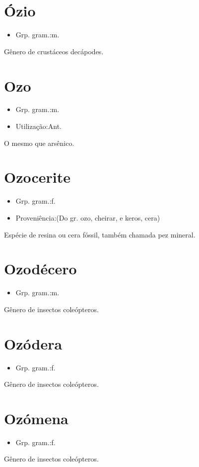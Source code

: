 \section{Ózio}
\begin{itemize}
\item {Grp. gram.:m.}
\end{itemize}
Gênero de crustáceos decápodes.
\section{Ozo}
\begin{itemize}
\item {Grp. gram.:m.}
\end{itemize}
\begin{itemize}
\item {Utilização:Ant.}
\end{itemize}
O mesmo que \textunderscore arsênico\textunderscore .
\section{Ozocerite}
\begin{itemize}
\item {Grp. gram.:f.}
\end{itemize}
\begin{itemize}
\item {Proveniência:(Do gr. \textunderscore ozo\textunderscore , cheirar, e \textunderscore keros\textunderscore , cera)}
\end{itemize}
Espécie de resina ou cera fóssil, também chamada pez mineral.
\section{Ozodécero}
\begin{itemize}
\item {Grp. gram.:m.}
\end{itemize}
Gênero de insectos coleópteros.
\section{Ozódera}
\begin{itemize}
\item {Grp. gram.:f.}
\end{itemize}
Gênero de insectos coleópteros.
\section{Ozómena}
\begin{itemize}
\item {Grp. gram.:f.}
\end{itemize}
Gênero de insectos coleópteros.
